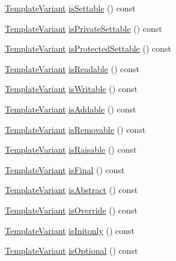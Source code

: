 \begin{DoxyCompactItemize}
\item 
\hyperlink{class_template_variant}{Template\+Variant} \hyperlink{class_member_context_1_1_private_a641d5e277af367d858f8b566bcc34e23}{is\+Settable} () const 
\item 
\hyperlink{class_template_variant}{Template\+Variant} \hyperlink{class_member_context_1_1_private_a147f3d3edf4a7fcaa18912878105c349}{is\+Private\+Settable} () const 
\item 
\hyperlink{class_template_variant}{Template\+Variant} \hyperlink{class_member_context_1_1_private_a2355a05a8d5750ee6c79ef65e6d97bb3}{is\+Protected\+Settable} () const 
\item 
\hyperlink{class_template_variant}{Template\+Variant} \hyperlink{class_member_context_1_1_private_a0300360e09a02038051b0d6b947e6265}{is\+Readable} () const 
\item 
\hyperlink{class_template_variant}{Template\+Variant} \hyperlink{class_member_context_1_1_private_a28edab86c5c504fc52c439b34ed58c16}{is\+Writable} () const 
\item 
\hyperlink{class_template_variant}{Template\+Variant} \hyperlink{class_member_context_1_1_private_a9ea12c817162c72b11ef7a41d6dffcdf}{is\+Addable} () const 
\item 
\hyperlink{class_template_variant}{Template\+Variant} \hyperlink{class_member_context_1_1_private_a2c2d4aef2b78194a2b28659e22065b26}{is\+Removable} () const 
\item 
\hyperlink{class_template_variant}{Template\+Variant} \hyperlink{class_member_context_1_1_private_ac30c4ddd36707a1ae88063ffadb2c022}{is\+Raisable} () const 
\item 
\hyperlink{class_template_variant}{Template\+Variant} \hyperlink{class_member_context_1_1_private_a18db43ef181e6799a1c6dbaa6596c4f0}{is\+Final} () const 
\item 
\hyperlink{class_template_variant}{Template\+Variant} \hyperlink{class_member_context_1_1_private_aa112631561d691a15449cc484fad91ba}{is\+Abstract} () const 
\item 
\hyperlink{class_template_variant}{Template\+Variant} \hyperlink{class_member_context_1_1_private_a225f5caa28d07c1704ba99cd40dd6445}{is\+Override} () const 
\item 
\hyperlink{class_template_variant}{Template\+Variant} \hyperlink{class_member_context_1_1_private_ac9984188e5fd9b4899d3bf15dacf42c3}{is\+Initonly} () const 
\item 
\hyperlink{class_template_variant}{Template\+Variant} \hyperlink{class_member_context_1_1_private_a3651e0ed82b98ec8416300ff19a43492}{is\+Optional} () const 

\end{DoxyCompactItemize}
